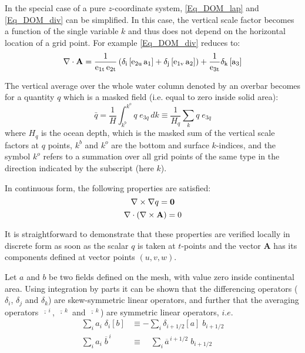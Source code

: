 \documentclass[NEMO_book]{subfiles}
\begin{document}
In the special case of a pure $z$-coordinate system, \eqref{Eq_DOM_lap} and 
\eqref{Eq_DOM_div} can be simplified. In this case, the vertical scale factor 
becomes a function of the single variable $k$ and thus does not depend on the 
horizontal location of a grid point. For example \eqref{Eq_DOM_div} reduces to: 
\begin{equation*}
\nabla \cdot \rm{\bf A}=\frac{1}{e_{1t}\,e_{2t}} \left( \delta_i \left[e_{2u}\,a_1 \right] 
                                                                              +\delta_j \left[e_{1v}\, a_2 \right]  \right)
                                                     +\frac{1}{e_{3t}} \delta_k \left[             a_3 \right]
\end{equation*}

The vertical average over the whole water column denoted by an overbar becomes 
for a quantity $q$ which is a masked field (i.e. equal to zero inside solid area):
\begin{equation} \label{DOM_bar}
\bar q 	=         \frac{1}{H}    \int_{k^b}^{k^o} {q\;e_{3q} \,dk} 
		\equiv \frac{1}{H_q }\sum\limits_k {q\;e_{3q} }
\end{equation}
where $H_q$  is the ocean depth, which is the masked sum of the vertical scale 
factors at $q$ points, $k^b$ and $k^o$ are the bottom and surface $k$-indices, 
and the symbol $k^o$ refers to a summation over all grid points of the same type 
in the direction indicated by the subscript (here $k$). 

In continuous form, the following properties are satisfied:
\begin{equation} \label{Eq_DOM_curl_grad}
\nabla \times \nabla q ={\rm {\bf {0}}}
\end{equation}
\begin{equation} \label{Eq_DOM_div_curl}
\nabla \cdot \left( {\nabla \times {\rm {\bf A}}} \right)=0
\end{equation}

It is straightforward to demonstrate that these properties are verified locally in 
discrete form as soon as the scalar $q$ is taken at $t$-points and the vector 
\textbf{A} has its components defined at vector points $(u,v,w)$.

Let $a$ and $b$ be two fields defined on the mesh, with value zero inside 
continental area. Using integration by parts it can be shown that the differencing 
operators ($\delta_i$, $\delta_j$ and $\delta_k$) are skew-symmetric linear operators, 
and further that the averaging operators $\overline{\,\cdot\,}^{\,i}$, 
$\overline{\,\cdot\,}^{\,k}$ and $\overline{\,\cdot\,}^{\,k}$) are symmetric linear 
operators, $i.e.$
\begin{align} 
\label{DOM_di_adj}
\sum\limits_i { a_i \;\delta _i \left[ b \right]} 
	&\equiv -\sum\limits_i {\delta _{i+1/2} \left[ a \right]\;b_{i+1/2} }      \\
\label{DOM_mi_adj}
\sum\limits_i { a_i \;\overline b^{\,i}} 
	& \equiv \quad \sum\limits_i {\overline a ^{\,i+1/2}\;b_{i+1/2} } 
\end{align}
\end{document}
